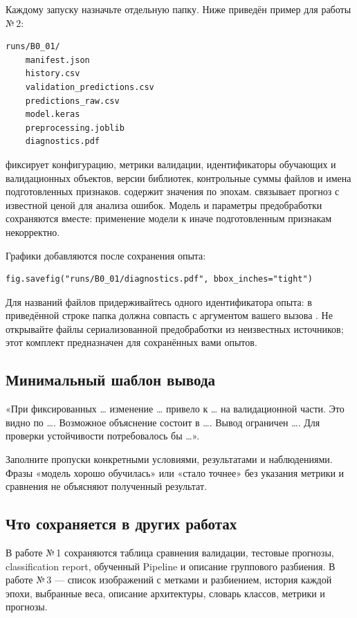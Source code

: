 Каждому запуску назначьте отдельную папку. Ниже приведён пример для работы №\,2:
\begin{lstlisting}[language={}]
runs/B0_01/
    manifest.json
    history.csv
    validation_predictions.csv
    predictions_raw.csv
    model.keras
    preprocessing.joblib
    diagnostics.pdf
\end{lstlisting}

 фиксирует конфигурацию, метрики валидации,
идентификаторы обучающих и валидационных объектов, версии библиотек,
контрольные суммы файлов и имена подготовленных признаков.
 содержит значения по эпохам.
 связывает прогноз с известной
ценой для анализа ошибок. Модель и параметры предобработки сохраняются
вместе: применение модели к иначе подготовленным признакам некорректно.

Графики добавляются после сохранения опыта:
\begin{lstlisting}
fig.savefig("runs/B0_01/diagnostics.pdf", bbox_inches="tight")
\end{lstlisting}

Для названий файлов придерживайтесь одного идентификатора опыта:
в приведённой строке папка  должна совпасть с
аргументом вашего вызова .
Не открывайте файлы сериализованной предобработки из неизвестных источников;
этот комплект предназначен для сохранённых вами опытов.

\subsection*{Минимальный шаблон вывода}
«При фиксированных \ldots{} изменение \ldots{} привело к \ldots{}
на валидационной части. Это видно по \ldots{}. Возможное объяснение
состоит в \ldots{}. Вывод ограничен \ldots{}. Для проверки устойчивости
потребовалось бы \ldots{}».

Заполните пропуски конкретными условиями, результатами и наблюдениями.
Фразы «модель хорошо обучилась» или «стало точнее» без указания метрики
и сравнения не объясняют полученный результат.

\subsection*{Что сохраняется в других работах}
В работе №\,1 сохраняются таблица сравнения валидации, тестовые прогнозы, classification report, обученный Pipeline и описание группового разбиения. В работе №\,3 --- список изображений с метками и разбиением, история каждой эпохи, выбранные веса, описание архитектуры, словарь классов, метрики и прогнозы.

